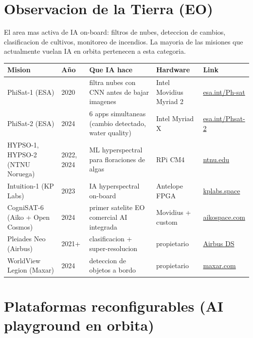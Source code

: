 \documentclass[11pt,a4paper,oneside]{report}
\begin{document}
\tableofcontents
\clearpage

\chapter{Observacion de la Tierra (EO)}

El area mas activa de IA on-board: filtros de nubes, deteccion de cambios,
clasificacion de cultivos, monitoreo de incendios. La mayoria de las
misiones que actualmente vuelan IA en orbita pertenecen a esta categoria.

\begin{longtable}{p{3.2cm}p{1cm}p{4.5cm}p{3.2cm}p{2.5cm}}
\toprule
\textbf{Mision} & \textbf{Año} & \textbf{Que IA hace} & \textbf{Hardware} & \textbf{Link} \\
\midrule
\endhead
PhiSat-1 (ESA)         & 2020      & filtra nubes con CNN antes de bajar imagenes & Intel Movidius Myriad 2 & \href{https://www.esa.int/Applications/Observing_the_Earth/Ph-sat}{esa.int/Ph-sat} \\
PhiSat-2 (ESA)         & 2024      & 6 apps simultaneas (cambio detectado, water quality) & Intel Myriad X & \href{https://www.esa.int/Applications/Observing_the_Earth/Phsat-2}{esa.int/Phsat-2} \\
HYPSO-1, HYPSO-2 (NTNU Noruega) & 2022, 2024 & ML hyperspectral para floraciones de algas & RPi CM4 & \href{https://www.ntnu.edu/ie/smallsat}{ntnu.edu} \\
Intuition-1 (KP Labs)  & 2023      & IA hyperspectral on-board & Antelope FPGA & \href{https://kplabs.space/intuition-1/}{kplabs.space} \\
CogniSAT-6 (Aiko + Open Cosmos) & 2024 & primer satelite EO comercial AI integrada & Movidius + custom & \href{https://aikospace.com/cognisat-6/}{aikospace.com} \\
Pleiades Neo (Airbus)  & 2021+     & clasificacion + super-resolucion & propietario & \href{https://www.intelligence-airbusds.com/pleiades-neo}{Airbus DS} \\
WorldView Legion (Maxar) & 2024    & deteccion de objetos a bordo & propietario & \href{https://www.maxar.com}{maxar.com} \\
\bottomrule
\end{longtable}

\chapter{Plataformas reconfigurables (AI playground en orbita)}
\end{document}
